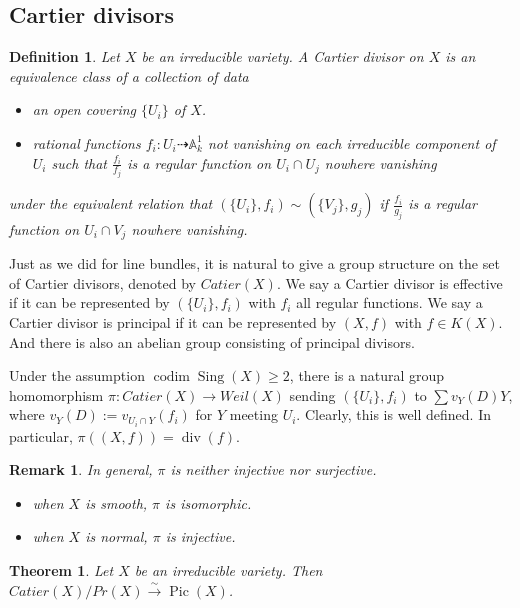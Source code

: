 \documentclass{ctexart}
\newtheorem{definition}{Definition}[section]
\newtheorem{remark}{Remark}[section]
\newtheorem{theorem}{Theorem}[section]
\newcommand{\codim}{\operatorname{codim}}
\newcommand{\singular}{\operatorname{Sing}}
\newcommand{\picardscheme}{\operatorname{Pic}}
\newcommand{\divisor}{\operatorname{div}}
\begin{document}
\subsection{Cartier divisors}
\label{subsection:Divisors_Cartier_divisors}

\begin{definition}
    Let $X$ be an irreducible variety.
    A Cartier divisor on $X$ is an equivalence class of a collection of data
    \begin{itemize}
        \item an open covering $\{U_{i}\}$ of $X$.
        \item rational functions $f_{i}: U_{i} \dashrightarrow \mathbb{A}_{k}^{1}$ not vanishing on each irreducible component of $U_{i}$ such that $\frac{f_{i}}{f_{j}}$ is a regular function on $U_{i} \cap U_{j}$ nowhere vanishing
    \end{itemize}
    under the equivalent relation that $(\{U_{i}\}, f_{i}) \sim (\{V_{j}\}, g_{j})$ if $\frac{f_{i}}{g_{j}}$ is a regular function on $U_{i} \cap V_{j}$ nowhere vanishing.
\end{definition}
Just as we did for line bundles, it is natural to give a group structure on the set of Cartier divisors, denoted by $Catier(X)$.
We say a Cartier divisor is effective if it can be represented by $(\{U_{i}\}, f_{i})$ with $f_{i}$ all regular functions.
We say a Cartier divisor is principal if it can be represented by $(X, f)$ with $f\in K(X)$.
And there is also an abelian group consisting of principal divisors.
\par
Under the assumption $\codim \singular (X) \ge 2$,
there is a natural group homomorphism $\pi: Catier(X) \rightarrow Weil(X)$ sending $(\{U_{i}\}, f_{i})$ to $\sum v_{Y}(D)Y$,
where $v_{Y}(D) := v_{U_{i} \cap Y}(f_{i})$ for $Y$ meeting $U_{i}$.
Clearly, this is well defined.
In particular, $\pi((X, f)) = \divisor (f)$.
\begin{remark}
    In general, $\pi$ is neither injective nor surjective.
    \begin{itemize}
        \item when $X$ is smooth, $\pi$ is isomorphic.
        \item when $X$ is normal, $\pi$ is injective.
    \end{itemize}
\end{remark}
\begin{theorem}
    Let $X$ be an irreducible variety.
    Then $Catier(X)/Pr(X) \overset{\sim}{\rightarrow} \picardscheme (X)$.
    \label{Theorem 7.1}
\end{theorem}
\end{document}
